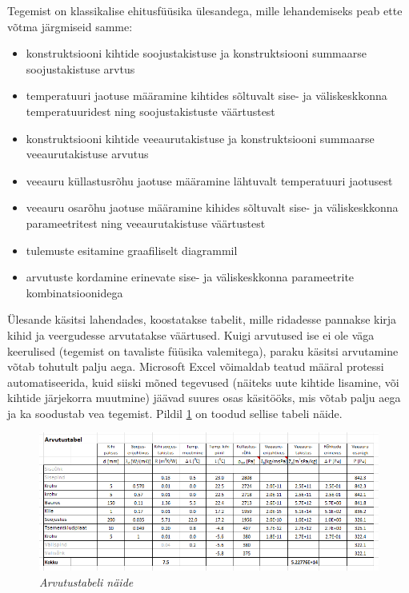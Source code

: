 Tegemist on klassikalise ehitusfüüsika ülesandega, mille lehandemiseks peab ette võtma järgmiseid samme:
\begin{itemize}
    \item konstruktsiooni kihtide soojustakistuse ja konstruktsiooni summaarse soojustakistuse arvtus
    \item temperatuuri jaotuse määramine kihtides sõltuvalt sise- ja väliskeskkonna temperatuuridest ning 
    soojustakistuste väärtustest
    \item konstruktsiooni kihtide veeaurutakistuse ja konstruktsiooni summaarse veeaurutakistuse arvutus
    \item veeauru küllastusrõhu jaotuse määramine lähtuvalt temperatuuri jaotusest
    \item veeauru osarõhu jaotuse määramine kihides sõltuvalt sise- ja väliskeskkonna parameetritest ning 
    veeaurutakistuse väärtustest
    \item tulemuste esitamine graafiliselt diagrammil
    \item arvutuste kordamine erinevate sise- ja väliskeskkonna parameetrite kombinatsioonidega
\end{itemize}

Ülesande käsitsi lahendades, koostatakse tabelit, mille ridadesse pannakse kirja kihid ja veergudesse arvutatakse 
väärtused. Kuigi arvutused ise ei ole väga keerulised (tegemist on tavaliste füüsika valemitega), paraku käsitsi arvutamine 
võtab tohutult palju aega. Microsoft Excel võimaldab teatud määral protessi automatiseerida, kuid siiski mõned 
tegevused (näiteks uute kihtide lisamine, või kihtide järjekorra muutmine) jäävad suures osas käsitööks, mis võtab palju 
aega ja ka soodustab vea tegemist. Pildil \ref{fig:excel_table_sample} on toodud sellise tabeli näide.
\begin{figure}[ht]
    \centering
    \includegraphics[width=.8\textwidth]{figures/problem_statement/04_calc_table.png}
    \caption[Näide niiskustehnilise analüüsi tulemuste esitamisest tabelis]{\textit{Arvutustabeli näide}}
    \label{fig:excel_table_sample}
\end{figure}

